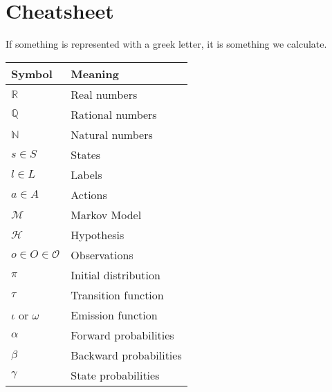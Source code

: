 \section{Cheatsheet}\label{sec:cheatsheet}
If something is represented with a greek letter, it is something we calculate.

\begin{table}[htb!]
    \centering
    \begin{tabular}{ll}
        \toprule
        \textbf{Symbol}                 & \textbf{Meaning}                                \\
        \midrule
        $\mathbb{R}$                    & Real numbers                                    \\
        $\mathbb{Q}$                    & Rational numbers                                \\
        $\mathbb{N}$                    & Natural numbers                                 \\
        $s \in S$                       & States                                          \\
        $l \in L$                       & Labels                                          \\
        $a \in A$                       & Actions                                         \\
        $\mathcal{M}$                   & Markov Model                                    \\
        $\mathcal{H}$                   & Hypothesis                                      \\
        $o \in O \in \mathcal{O}$       & Observations                                    \\
        $\pi$                           & Initial distribution                            \\
        $\tau$                          & Transition function                             \\
        $\iota$ or $\omega$             & Emission function                               \\
        $\alpha$                        & Forward probabilities                           \\
        $\beta$                         & Backward probabilities                          \\
        $\gamma$                        & State probabilities                             \\

\end{tabular}
\end{table}
